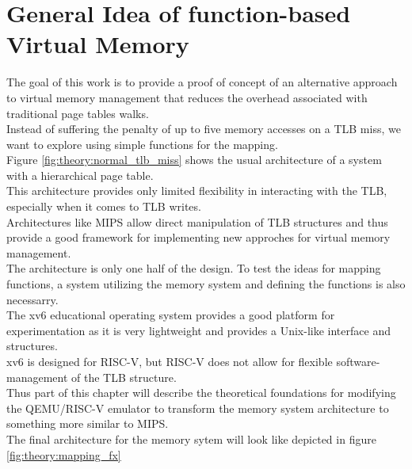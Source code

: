 


\section{General Idea of function-based Virtual Memory}


The goal of this work is to provide a proof of concept of an alternative approach
to virtual memory management that reduces the overhead associated with traditional page tables walks.\\
Instead of suffering the penalty of up to five memory accesses on a TLB miss,
we want to explore using simple functions for the mapping.\\

Figure \ref{fig:theory:normal_tlb_miss} shows the usual architecture of a system
with a hierarchical page table.\\
This architecture provides only limited flexibility in interacting with the TLB, especially when it comes to TLB writes.\\
Architectures like MIPS allow direct manipulation of TLB structures and thus provide a good framework for implementing new approches for virtual memory management.\\

The architecture is only one half of the design. To test the ideas for mapping
functions, a system utilizing the memory system and defining the functions is also necessarry.\\
The xv6 educational operating system provides a good platform for experimentation as it is very lightweight and provides a Unix-like interface and structures.\\

xv6 is designed for RISC-V, but RISC-V does not allow for flexible software-management of the TLB structure.\\
Thus part of this chapter will describe the theoretical foundations for modifying
the QEMU/RISC-V emulator to transform the memory system architecture to something
more similar to MIPS.\\
The final architecture for the memory sytem will look like depicted in figure \ref{fig:theory:mapping_fx}

